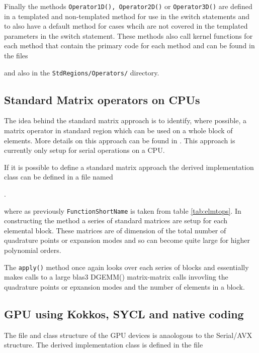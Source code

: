 Finally the methods \texttt{Operator1D(), Operator2D()} or
\texttt{Operator3D()} are defined in a templated and non-templated method
for use in the switch statements and to also have a default method for
cases whcih are not covered in the templated parameters in the switch
statement. These methods also call kernel functions for each method
that contain the primary code for each method and can be found in the
files


\noindent and also in the \texttt{StdRegions/Operators/} directory.


\subsection{Standard Matrix operators on CPUs}

The idea behind the standard matrix approach is to identify, where
possible, a matrix operator in standard region which can be used on a
whole block of elements. More details on this approach can be found in
\cite{Collections}. This approach is currently only setup for serial
operations on a CPU.

If it is possible to define a standard matrix approach the derived
implementation class can be  defined in a file named

. 

\noindent where as previously \texttt{FunctionShortName} is taken from
table \ref{tab:elmtops}. In constructing the method a series of
standard matrices are setup for each elemental block. These matrices
are of dimension of the total number of quadrature points or
expansion modes and so can become quite large for higher
polynomial orders.

The \texttt{apply()} method once again looks over each series of
blocks and essentially makes calls to a large blas3 DGEMM()
matrix-matrix calls invovling the quadrature points or epxansion modes
and the number of elements in a block.

\subsection{GPU using Kokkos, SYCL and native coding}

The file and class structure of the GPU devices is anaologous to the
Serial/AVX structure. The derived implementation class is defined
in the file


